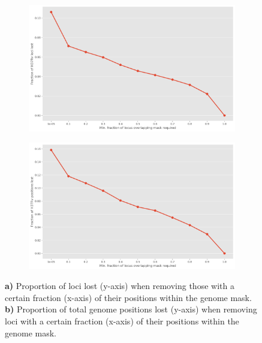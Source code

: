 \begin{figure}
     \centering
     \begin{subfigure}[b]{0.475\textwidth}
         \centering
         \includegraphics[width=\textwidth]{Appendix1/Figs/loci-lost.png}
         \caption{}
         \label{fig:loci-lost}
     \end{subfigure}
     \hfill
     \begin{subfigure}[b]{0.475\textwidth}
         \centering
         \includegraphics[width=\textwidth]{Appendix1/Figs/pos-lost.png}
         \caption{}
         \label{fig:pos-lost}
     \end{subfigure}
        \caption{\textbf{a)} Proportion of loci lost (y-axis) when removing those with a certain fraction (x-axis) of their positions within the genome mask. \textbf{b)} Proportion of total genome positions lost (y-axis) when removing loci with a certain fraction (x-axis) of their positions within the genome mask.}
        \label{fig:loci-mask}
\end{figure}
